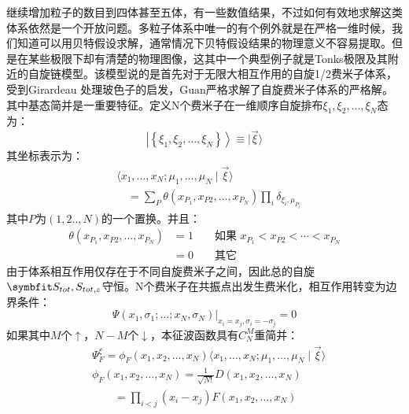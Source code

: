 继续增加粒子的数目到四体甚至五体，有一些数值结果\cite{Blume2010,blume2012few}，不过如何有效地求解这类体系依然是一个开放问题。多粒子体系中唯一的有个例外就是在严格一维时候，我们知道可以用贝特假设求解，通常情况下贝特假设结果的物理意义不容易提取。但是在某些极限下却有清楚的物理图像，这其中一个典型例子就是Tonks极限及其附近的自旋链模型\cite{Guan2009exact,ma2009mathematical,Lewenstein2013spinchain,volosniev2014strongly,Busch013spinchain,CuiHo2014,Santos2014spinchain,Puhan2015spinchain,Yang2016effective}。该模型说的是首先对于无限大相互作用的自旋1/2费米子体系，受到Girardeau 处理玻色子的启发，Guan严格求解了自旋费米子体系的严格解\cite{Guan2009exact}。其中基态简并是一重要特征。定义N个费米子在一维顺序自旋排布$\xi_{1}, \xi_{2}, \ldots, \xi_{N}$态为：
\begin{equation}
\left|\left\{\xi_{1}, \xi_{2}, \ldots, \xi_{N}\right\}\right\rangle \equiv|\vec{\xi}\rangle
\end{equation}
其坐标表示为：
\begin{equation}
\begin{aligned}
&\langle x_{1}, \ldots, x_{N} ; \mu_{1}, \ldots, \mu_{N} \mid \vec{\xi}\rangle \\
&\quad=\sum_{P} \theta\left(x_{P_{1}}, x_{P 2}, \ldots, x_{P_{N}}\right) \prod_{i} \delta_{\xi_{i}, \mu_{P_{i}}}
\end{aligned}
\end{equation}
其中$P$为$(1,2..,N)$的一个置换。并且：
\begin{equation}
\begin{aligned}
\theta\left(x_{P_{1}}, x_{P 2}, \ldots, x_{P_{N}}\right) &=1 & & \text { 如果 } x_{P_{1}}<x_{P 2}<\cdots<x_{P_{N}} \\
&=0 & & \text { 其它 }
\end{aligned}
\end{equation}
由于体系相互作用仅存在于不同自旋费米子之间，因此总的自旋$\Vector{S}_{tot},S_{tot,z}$守恒。N个费米子在共振点出发生费米化，相互作用转变为边界条件：
\begin{equation}
\left.\Psi\left(x_{1}, \sigma_{1} ; \ldots ; x_{N}, \sigma_{N}\right)\right|_{x_{i}=x_{j}, \sigma_{i}=-\sigma_{j}}=0
\end{equation}
如果其中$M$个$\uparrow$，$N-M$个$\downarrow$，本征波函数具有$C_N^M$重简并：
\begin{equation}
\begin{split}
&\Psi_{F}^{\xi}=\phi_{F}\left(x_{1}, x_{2}, \ldots, x_{N}\right)\langle x_{1}, \ldots, x_{N} ; \mu_{1}, \ldots, \mu_{N} \mid \vec{\xi}\rangle\\
&\phi_{F}\left(x_{1}, x_{2}, \ldots, x_{N}\right) =\frac{1}{\sqrt{N !}} D\left(x_{1}, x_{2}, \ldots, x_{N}\right) \\
&\quad\quad =\prod_{i<j}\left(x_{i}-x_{j}\right) F\left(x_{1}, x_{2}, \ldots, x_{N}\right)\\
\end{split}
\end{equation}
